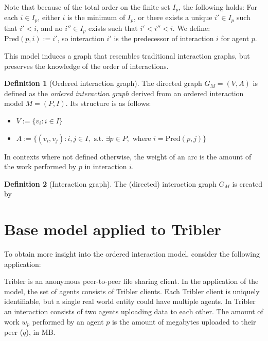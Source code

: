 \documentclass[a4paper,11pt]{book}
\newcommand{\pred}{\mathrm{Pred}}
\theoremstyle{definition}
\newtheorem{definition}{Definition}
\begin{document}
Note that because of the total order on the finite set $I_p$, the following holds:
For each $i \in I_p$, either $i$ is the minimum of $I_p$, or there exists
a unique $i' \in I_p$ such that $i' < i$, and no $i'' \in I_p$ exists such that
$i' < i'' < i$. We define: $\pred(p, i) := i'$, so interaction $i'$ is the predecessor
of interaction $i$ for agent $p$.

  
This model induces a graph that resembles traditional interaction graphs, but preserves the knowledge
of the order of interactions.
\begin{definition}[Ordered interaction graph]
    The directed graph $G_M = (V, A)$ is defined as the \emph{ordered interaction graph} derived from an ordered interaction model $M = (P,I)$.
    Its structure is as follows:

    \begin{itemize}
        \item $V := \{ v_{i} : i \in I\}$\\
        \item $A := \{ (v_{i}, v_{j}) : i, j \in I, \mbox{ s.t. } \exists p \in P, \mbox{ where } i = \pred(p, j)\}$
    \end{itemize}

    In contexts where not defined otherwise, the weight of an arc is the amount of the work performed by $p$ in
    interaction $i$. 
\end{definition}


\begin{definition}[Interaction graph]
    The (directed) interaction graph $G_M$ is created by %

\end{definition}



\section{Base model applied to Tribler}

To obtain more insight into the ordered interaction model, consider the following application:

Tribler is an anonymous peer-to-peer file sharing client. In the application of the model,
the set of agents consists of Tribler clients. Each Tribler client is uniquely identifiable,
but a single real world entity could have multiple agents. In Tribler an interaction
consists of two agents uploading data to each other. The amount of work $w_p$ performed
by an agent $p$ is the amount of megabytes uploaded to their peer ($q$), in MB.
\end{document}
